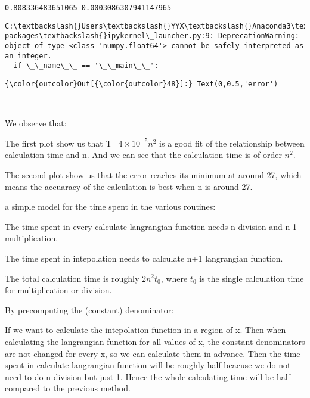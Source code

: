 \documentclass[11pt]{article}
\begin{document}
    \begin{Verbatim}[commandchars=\\\{\}]
0.808336483651065 0.0003086307941147965

    \end{Verbatim}

    \begin{Verbatim}[commandchars=\\\{\}]
C:\textbackslash{}Users\textbackslash{}YYX\textbackslash{}Anaconda3\textbackslash{}lib\textbackslash{}site-packages\textbackslash{}ipykernel\_launcher.py:9: DeprecationWarning: object of type <class 'numpy.float64'> cannot be safely interpreted as an integer.
  if \_\_name\_\_ == '\_\_main\_\_':

    \end{Verbatim}

\begin{Verbatim}[commandchars=\\\{\}]
{\color{outcolor}Out[{\color{outcolor}48}]:} Text(0,0.5,'error')
\end{Verbatim}
            
    \begin{center}
    \end{center}
    { \hspace*{\fill} \\}
    
    We observe that:

The first plot show us that T=\(4\times10^{-5} n^2\) is a good fit of
the relationship between calculation time and n. And we can see that the
calculation time is of order \(n^2\).

The second plot show us that the error reaches its minimum at around 27,
which means the accuaracy of the calculation is best when n is around
27.

    a simple model for the time spent in the various routines:

The time spent in every calculate langrangian function needs n division
and n-1 multiplication.

The time spent in intepolation needs to calculate n+1 langrangian
function.

The total calculation time is roughly \(2n^2 t_0\), where \(t_0\) is the
single calculation time for multiplication or division.

    By precomputing the (constant) denominator:

If we want to calculate the intepolation function in a region of x. Then
when calculating the langrangian function for all values of x, the
constant denominators are not changed for every x, so we can calculate
them in advance. Then the time spent in calculate langrangian function
will be roughly half beacuse we do not need to do n division but just 1.
Hence the whole calculating time will be half compared to the previous
method.
\end{document}
